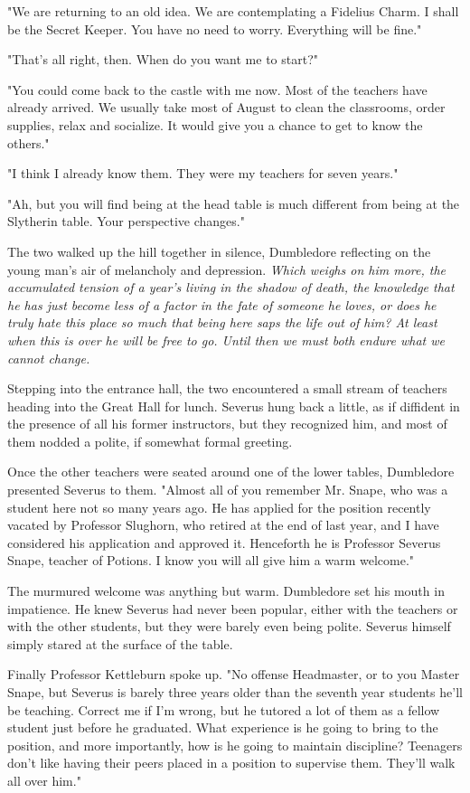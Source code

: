 \documentclass[a4paper,11pt]{article}
\begin{document}
"We are returning to an old idea. We are contemplating a Fidelius Charm. I shall be the Secret Keeper. You have no need to worry. Everything will be fine."

"That's all right, then. When do you want me to start?"

"You could come back to the castle with me now. Most of the teachers have already arrived. We usually take most of August to clean the classrooms, order supplies, relax and socialize. It would give you a chance to get to know the others."

"I think I already know them. They were my teachers for seven years."

"Ah, but you will find being at the head table is much different from being at the Slytherin table. Your perspective changes."

The two walked up the hill together in silence, Dumbledore reflecting on the young man's air of melancholy and depression. \emph{Which weighs on him more, the accumulated tension of a year's living in the shadow of death, the knowledge that he has just become less of a factor in the fate of someone he loves, or does he truly hate this place so much that being here saps the life out of him? At least when this is over he will be free to go. Until then we must both endure what we cannot change.}

Stepping into the entrance hall, the two encountered a small stream of teachers heading into the Great Hall for lunch. Severus hung back a little, as if diffident in the presence of all his former instructors, but they recognized him, and most of them nodded a polite, if somewhat formal greeting.

Once the other teachers were seated around one of the lower tables, Dumbledore presented Severus to them. "Almost all of you remember Mr. Snape, who was a student here not so many years ago. He has applied for the position recently vacated by Professor Slughorn, who retired at the end of last year, and I have considered his application and approved it. Henceforth he is Professor Severus Snape, teacher of Potions. I know you will all give him a warm welcome."

The murmured welcome was anything but warm. Dumbledore set his mouth in impatience. He knew Severus had never been popular, either with the teachers or with the other students, but they were barely even being polite. Severus himself simply stared at the surface of the table.

Finally Professor Kettleburn spoke up. "No offense Headmaster, or to you Master Snape, but Severus is barely three years older than the seventh year students he'll be teaching. Correct me if I'm wrong, but he tutored a lot of them as a fellow student just before he graduated. What experience is he going to bring to the position, and more importantly, how is he going to maintain discipline? Teenagers don't like having their peers placed in a position to supervise them. They'll walk all over him."
\end{document}
